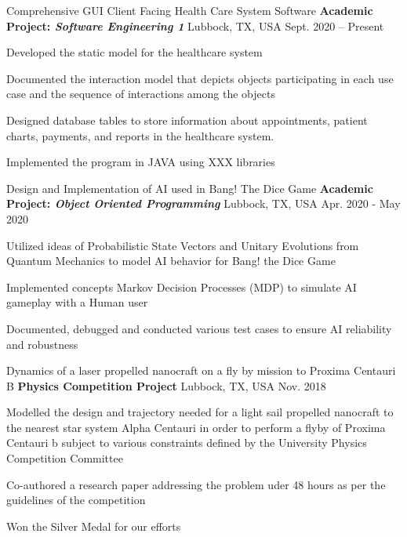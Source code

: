 \begin{cventries}
  \cventry
  {Comprehensive GUI Client Facing Health Care System Software}
  {\textbf{Academic Project: \textit{Software Engineering 1}}}
    {Lubbock, TX, USA}
    {Sept. 2020 -- Present}
    {
      \begin{cvitems}
      \item{Developed the static model for the healthcare system}
    \item{Documented the interaction model that depicts objects participating in each use case and the sequence of interactions among the objects}
    \item{Designed database tables to store information about appointments, patient charts, payments, and reports in the healthcare system.}
    \item{Implemented the program in JAVA using XXX libraries}
      \end{cvitems}
    }

  \cventry
  {Design and Implementation of AI used in Bang! The Dice Game}
  {\textbf{Academic Project: \textit{Object Oriented Programming}}}
    {Lubbock, TX, USA}
    {Apr. 2020 - May 2020}
    {
      \begin{cvitems}
      \item{Utilized ideas of Probabilistic State Vectors and Unitary Evolutions from Quantum Mechanics to model AI behavior for Bang! the Dice Game}
      \item{Implemented concepts Markov Decision Processes (MDP) to simulate AI gameplay with a Human user}
      \item{Documented, debugged and conducted various test cases to ensure AI reliability and robustness}
      \end{cvitems}
    }

  \cventry
  {Dynamics of a laser propelled nanocraft on a fly by mission to Proxima Centauri B}
  {\textbf{Physics Competition Project}}
    {Lubbock, TX, USA}
    {Nov. 2018}
    {
      \begin{cvitems}
      \item{Modelled the design and trajectory needed for a light sail propelled nanocraft to the nearest star system Alpha Centauri in order to perform a flyby of Proxima Centauri b subject to various constraints defined by the University Physics Competition Committee}
      \item{Co-authored a research paper addressing the problem uder 48 hours as per the guidelines of the competition}
     \item{Won the Silver Medal for our efforts}
      \end{cvitems}
    }


\end{cventries}
